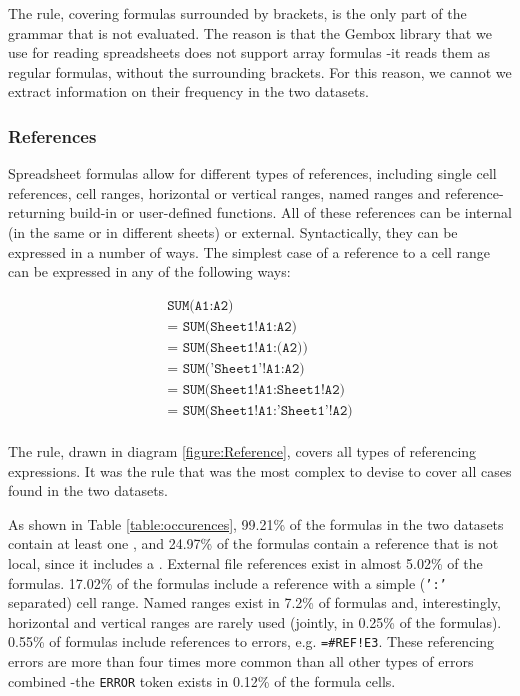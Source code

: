 \documentclass[conference]{IEEEtran}
\begin{document}
The  rule, covering formulas surrounded by brackets, is the only part of the grammar that is not evaluated. The reason is that the Gembox library that we use for reading spreadsheets does not support array formulas -it reads them as regular formulas, without the surrounding brackets. For this reason, we cannot we extract information on their frequency in the two datasets.

\subsubsection{References}

Spreadsheet formulas allow for different types of references, including single cell references, cell ranges, horizontal or vertical ranges, named ranges and reference-returning build-in or user-defined functions. All of these references can be internal (in the same or in different sheets) or external. Syntactically, they can be expressed in a number of ways. The simplest case of a reference to a cell range can be expressed in any of the following ways:

\begin{eqnarray*}
	\texttt{SUM(A1:A2)} \\ 
	\texttt{= SUM(Sheet1!A1:A2)} \\
	\texttt{= SUM(Sheet1!A1:(A2))} \\
	\texttt{= SUM('Sheet1'!A1:A2)} \\
	\texttt{= SUM(Sheet1!A1:Sheet1!A2)} \\
	\texttt{= SUM(Sheet1!A1:'Sheet1'!A2)} \\
\end{eqnarray*}

The  rule, drawn in diagram \ref{figure:Reference}, covers all types of referencing expressions. It was the rule that was the most complex to devise to cover all cases found in the two datasets.

As shown in Table \ref{table:occurences}, 99.21\% of the formulas in the two datasets contain at least one , and 24.97\% of the formulas contain a reference that is not local, since it includes a . External file references exist in almost 5.02\% of the formulas. 17.02\% of the formulas include a reference with a simple (\texttt{':'} separated) cell range. Named ranges exist in 7.2\% of formulas and, interestingly, horizontal and vertical ranges are rarely used (jointly, in 0.25\% of the formulas). 0.55\% of formulas include references to errors, e.g. \texttt{=\#REF!E3}. These referencing errors are more than four times more common than all other types of errors combined -the \texttt{ERROR} token exists in 0.12\% of the formula cells.
\end{document}
